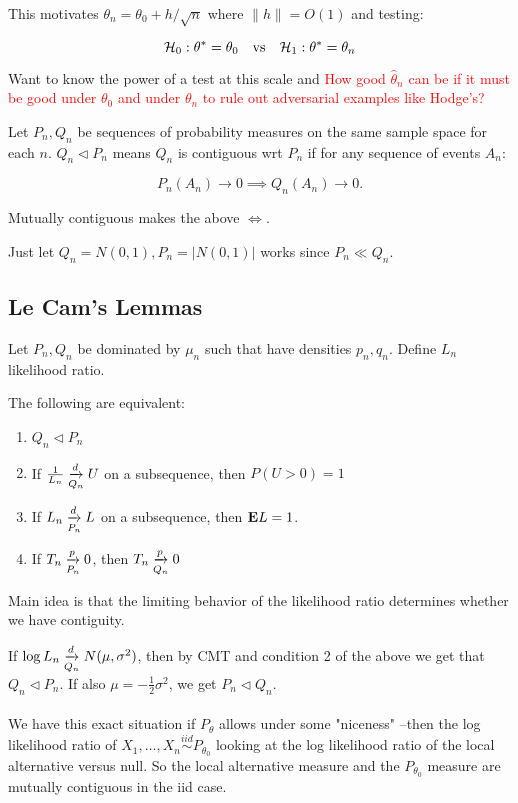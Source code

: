 \documentclass{article}
\newcommand\myworries[1]{\textcolor{red}{#1}}
\newcommand{\simiid}{\overset{iid}\sim }
\begin{document}
This motivates $\theta_n = \theta_0 + h/\sqrt{n}$ where $\|h\| = O(1)$ and testing:

$$\mathcal H_0: \theta^* = \theta_0 \quad \text{vs} \quad \mathcal H_1: \theta^* = \theta_n$$

Want to know the power of a test at this scale and \myworries{How good $\hat \theta_n$ can be if it must be good under $\theta_0$ and under $\theta_n$ to rule out adversarial examples like Hodge's?}

\begin{definition}[Contiguity]
Let $P_n, Q_n$ be sequences of probability measures on the same sample space for each $n$. $Q_n \triangleleft P_n$ means $Q_n$ is contiguous wrt $P_n$ if for any sequence of events $A_n$:

$$P_n(A_n) \to 0 \implies Q_n(A_n) \to 0.$$

Mutually contiguous makes the above $\iff$. 
\end{definition}

\begin{example}
Just let $Q_n = N(0,1), P_n = |N(0,1)|$ works since $P_n \ll Q_n$.  
\end{example}

\subsection{Le Cam's Lemmas}
Let $P_n, Q_n$ be dominated by $\mu_n$ such that have densities $p_n, q_n$. Define $L_n$ likelihood ratio. 

\begin{theorem}[Le Cam 1]
The following are equivalent:

\begin{enumerate}
	\item $Q_n \triangleleft P_n$
	\item If $\frac{1}{L_n} \underset{Q_n}{\xrightarrow{d}} U$ on a subsequence, then $P(U>0) = 1$
	\item If $L_n \underset{P_n}{\xrightarrow{d}} L$ on a subsequence, then $\mathbf{E} L = 1$.
	\item If $T_n \underset{P_n}{\xrightarrow{p}} 0$, then $T_n \underset{Q_n}{\xrightarrow{p}} 0$
\end{enumerate}
Main idea is that the limiting behavior of the likelihood ratio determines whether we have contiguity. 
\end{theorem}

\begin{example}
If $\log L_n \underset{Q_n}{\xrightarrow{d}} N(\mu,\sigma^2)$, then by CMT and condition 2 of the above we get that $Q_n \triangleleft P_n$. If also $\mu=-\frac{1}{2} \sigma^2$, we get $P_n \triangleleft Q_n$. \\\\

We have this exact situation if $P_\theta$ allows under some "niceness" --then the log likelihood ratio of $X_1,\ldots,X_n \simiid P_{\theta_0}$ looking at the log likelihood ratio of the local alternative versus null. So the local alternative measure and the $P_{\theta_0}$ measure are mutually contiguous in the iid case. 
\end{example}
\end{document}
